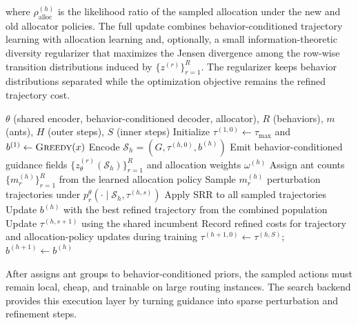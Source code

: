 where $\rho_{\mathrm{alloc}}^{(h)}$ is the likelihood ratio of the sampled allocation under the new and old allocator policies. The full update combines behavior-conditioned trajectory learning with allocation learning and, optionally, a small information-theoretic diversity regularizer that maximizes the Jensen divergence among the row-wise transition distributions induced by $\{z^{(r)}\}_{r=1}^R$. The regularizer keeps behavior distributions separated while the optimization objective remains the refined trajectory cost.

\begin{algorithm}[t]
\caption{Trajectory-diverse guidance with learned behavior allocation for \DyNACS{}.}
\label{alg:trajectory-diverse}
\begin{algorithmic}[1]
\REQUIRE $\theta$ (shared encoder, behavior-conditioned decoder, allocator), $R$ (behaviors), $m$ (ants), $H$ (outer steps), $S$ (inner steps)
\STATE Initialize $\tau^{(1,0)} \gets \tau_{\max}$ and $b^{(1)} \gets \textsc{Greedy}(x)$
    \STATE Encode $\mathcal{S}_h=(G,\tau^{(h,0)},b^{(h)})$
    \STATE Emit behavior-conditioned guidance fields $\{z_\theta^{(r)}(\mathcal{S}_h)\}_{r=1}^R$ and allocation weights $\omega^{(h)}$
    \STATE Assign ant counts $\{m_r^{(h)}\}_{r=1}^R$ from the learned allocation policy
            \STATE Sample $m_r^{(h)}$ perturbation trajectories under $p_r^\theta(\cdot \mid \mathcal{S}_h,\tau^{(h,s)})$
        \ENDFOR
        \STATE Apply SRR to all sampled trajectories
        \STATE Update $b^{(h)}$ with the best refined trajectory from the combined population
        \STATE Update $\tau^{(h,s+1)}$ using the shared incumbent
        \STATE Record refined costs for trajectory and allocation-policy updates during training
    \ENDFOR
    \STATE $\tau^{(h+1,0)} \gets \tau^{(h,S)}$; \, $b^{(h+1)} \gets b^{(h)}$
\ENDFOR
\end{algorithmic}
\end{algorithm}

After \DyNACS{} assigns ant groups to behavior-conditioned priors, the sampled actions must remain local, cheap, and trainable on large routing instances. The search backend provides this execution layer by turning \DyNACS{} guidance into sparse perturbation and refinement steps.


